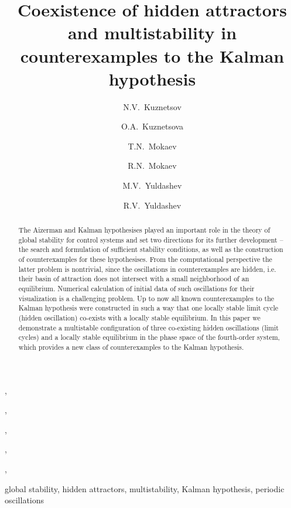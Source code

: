 \documentclass{ifacconf}
\theoremstyle{plain}
\begin{document}
\begin{frontmatter}

\title{Coexistence of hidden attractors and multistability in counterexamples to the Kalman hypothesis}


\author[spbu,jyv,ipme]{N.V.~Kuznetsov},
\author[spbu]{O.A.~Kuznetsova},
\author[spbu]{T.N.~Mokaev},
\author[spbu,jyv]{R.N.~Mokaev},
\author[spbu]{M.V.~Yuldashev},
\author[spbu]{R.V.~Yuldashev}

\address[spbu]{Faculty of Mathematics and Mechanics, \\ St. Petersburg State University, Russia}
\address[jyv]{Dept. of Mathematical Information Technology,\\
University of Jyv\"{a}skyl\"{a}, Jyv\"{a}skyl\"{a}, Finland}
\address[ipme]{Institute for Problems in Mechanical Engineering RAS, Russia}

\begin{abstract}                %
The Aizerman and Kalman hypothesises played an important role in
the theory of global stability for control systems
and set two directions for its further development --
the search and formulation of sufficient stability conditions,
as well as the construction of counterexamples for these hypothesises.
From the computational perspective the latter problem is nontrivial,
since the oscillations in counterexamples are hidden,
i.e. their basin of attraction does not intersect with a small neighborhood of an equilibrium.
Numerical calculation of initial data of such oscillations for their visualization
is a challenging problem.
Up to now all known counterexamples to the Kalman hypothesis were constructed in such a way
that one locally stable limit cycle (hidden oscillation) co-exists with a locally stable equilibrium.
In this paper we demonstrate a multistable configuration of three co-existing hidden oscillations
(limit cycles) and a locally stable equilibrium
in the phase space of the fourth-order system, which provides
a new class of counterexamples to the Kalman hypothesis.
\end{abstract}

\begin{keyword}
global stability, hidden attractors, multistability, Kalman hypothesis, periodic oscillations
\end{keyword}

\end{frontmatter}
\end{document}
